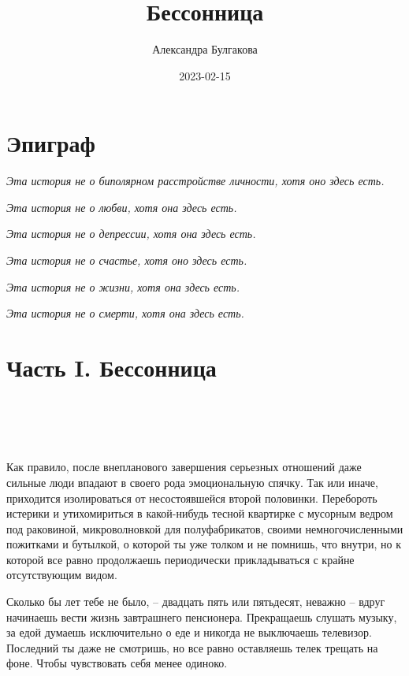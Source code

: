\documentclass[
]{book}
\title{Бессонница}
\author{Александра Булгакова}
\date{2023-02-15}
\begin{document}
\maketitle

{
\setcounter{tocdepth}{1}
\tableofcontents
}
\hypertarget{ux44dux43fux438ux433ux440ux430ux444}{%
\chapter*{Эпиграф}\label{ux44dux43fux438ux433ux440ux430ux444}}

\emph{Эта история не о биполярном расстройстве личности, хотя оно здесь есть.}

\emph{Эта история не о любви, хотя она здесь есть.}

\emph{Эта история не о депрессии, хотя она здесь есть.}

\emph{Эта история не о счастье, хотя оно здесь есть.}

\emph{Эта история не о жизни, хотя она здесь есть.}

\emph{Эта история не о смерти, хотя она здесь есть.}

\hypertarget{ux447ux430ux441ux442ux44c-i.-ux431ux435ux441ux441ux43eux43dux43dux438ux446ux430}{%
\chapter*{Часть I. Бессонница}\label{ux447ux430ux441ux442ux44c-i.-ux431ux435ux441ux441ux43eux43dux43dux438ux446ux430}}

\hypertarget{chapter-1}{%
\chapter{~}\label{chapter-1}}

Как правило, после внепланового завершения серьезных отношений даже сильные люди впадают в своего рода эмоциональную спячку. Так или иначе, приходится изолироваться от несостоявшейся второй половинки. Перебороть истерики и утихомириться в какой-нибудь тесной квартирке с мусорным ведром под раковиной, микроволновкой для полуфабрикатов, своими немногочисленными пожитками и бутылкой, о которой ты уже толком и не помнишь, что внутри, но к которой все равно продолжаешь периодически прикладываться с крайне отсутствующим видом.

Сколько бы лет тебе не было, -- двадцать пять или пятьдесят, неважно -- вдруг начинаешь вести жизнь завтрашнего пенсионера. Прекращаешь слушать музыку, за едой думаешь исключительно о еде и никогда не выключаешь телевизор. Последний ты даже не смотришь, но все равно оставляешь телек трещать на фоне. Чтобы чувствовать себя менее одиноко.
\end{document}
